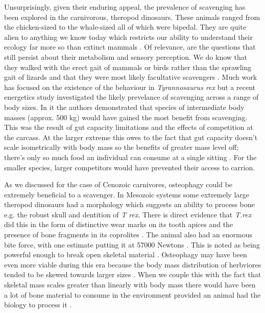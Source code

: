 \documentclass[a4paper,12pt]{article}
\begin{document}
Unsurprisingly, given their enduring appeal, the prevalence of scavenging has been explored in the carnivorous, theropod dinosaurs. These animals ranged from the chicken-sized to the whale-sized all of which were bipedal. They are quite alien to anything we know today which restricts our ability to understand their ecology far more so than extinct mammals \citep{weishampel2004dinosauria}. Of relevance, are the questions that still persist about their metabolism \citep{grady2014evidence} and sensory perception. We do know that they walked with the erect gait of mammals or birds rather than the sprawling gait of lizards and that they were most likely facultative scavengers \citep{depalma2013physical}. Much work has focused on the existence of the behaviour in \textit{Tyrannosaurus rex} \citep{ruxton2003could,carbone2011intra} but a recent energetics study investigated the likely prevelance of scavenging across a range of body sizes. In it the authors demonstrated that species of intermediate body masses (approx. 500 kg) would have gained the most benefit from scavenging. This was the result of gut capacity limitations and the effects of competition at the carcass. At the larger extreme this owes to the fact that gut capacity doesn't scale isometrically with body mass so the benefits of greater mass level off; there's only so much food an individual can consume at a single sitting \citep{calder1996size}. For the smaller species, larger competitors would have prevented their access to carrion. 

As we discussed for the case of Cenozoic carnivores, osteophagy could be extremely beneficial to a scavenger. 
In Mesozoic systems some extremely large theropod dinosaurs had a morphology which suggests an ability to process bone e.g. the robust skull and dentition of \textit{T rex}. There is direct evidence that \textit{T.rex} did this in the form of distinctive wear marks on its tooth apices \citep{farlow1994wear,schubert2005wear} and the presence of bone fragments in its coprolites \citep{chin1998king}. The animal also had an enormous bite force, with one estimate putting it at 57000 Newtons \citep{bates2012estimating}. This is noted as being powerful enough to break open skeletal material \citep{rayfield2001cranial}. Osteophagy may have been even more viable during this era because the body mass distribution of herbviores tended to be skewed towards larger sizes \citep{10.1371/journal.pone.0051925}. When we couple this with the fact that skeletal mass scales greater than linearly with body mass \citep{prange1979scaling} there would have been a lot of bone material to consume in the environment provided an animal had the biology to process it  \citep{chure1997one}. 
\end{document}
